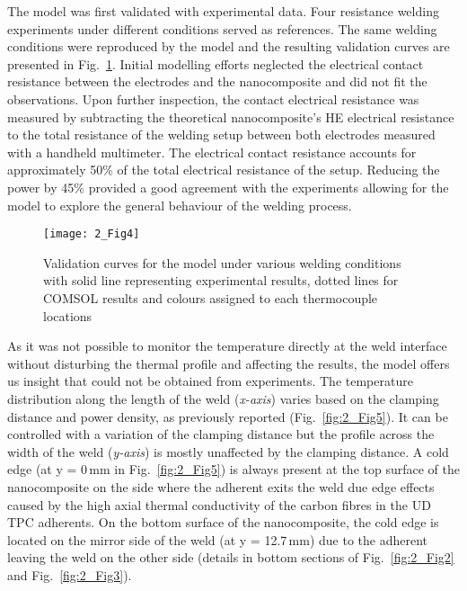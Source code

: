 The model was first validated with experimental data. 
Four resistance welding experiments under different conditions served as references. 
The same welding conditions were reproduced by the model and the resulting validation curves are presented in \mbox{Fig. \ref{fig:2_Fig4}}. 
Initial modelling efforts neglected the electrical contact resistance between the electrodes and the nanocomposite and did not fit the observations. 
Upon further inspection, the contact electrical resistance was measured by subtracting the theoretical nanocomposite’s HE electrical resistance to the total resistance of the welding setup between both electrodes measured with a handheld multimeter. 
The electrical contact resistance accounts for approximately 50\% of the total electrical resistance of the setup. 
Reducing the power by 45\% provided a good agreement with the experiments allowing for the model to explore the general behaviour of the welding process. 

\begin{figure}[ht]
	\center
	\texttt{[image: 2\_Fig4]}
	\caption{Validation curves for the model under various welding conditions with solid line representing experimental results, dotted lines for COMSOL results and colours assigned to each thermocouple locations \cite{Brassard2019b}}
	\label{fig:2_Fig4}
\end{figure} 

\FloatBarrier
As it was not possible to monitor the temperature directly at the weld interface without disturbing the thermal profile and affecting the results, the model offers us insight that could not be obtained from experiments. 
The temperature distribution along the length of the weld (\textit{x-axis}) varies based on the clamping distance and power density, as previously reported \cite{Talbot2013} (\mbox{Fig. \ref{fig:2_Fig5}}). 
It can be controlled with a variation of the clamping distance but the profile across the width of the weld (\textit{y-axis}) is mostly unaffected by the clamping distance. 
A cold edge (at y = \mbox{0\,mm} in \mbox{Fig. \ref{fig:2_Fig5}}) is always present at the top surface of the nanocomposite on the side where the adherent exits the weld due edge effects caused by the high axial thermal conductivity of the carbon fibres in the UD TPC adherents. 
On the bottom surface of the nanocomposite, the cold edge is located on the mirror side of the weld (at y = \mbox{12.7\,mm}) due to the adherent leaving the weld on the other side (details in bottom sections of \mbox{Fig. \ref{fig:2_Fig2}} and \mbox{Fig. \ref{fig:2_Fig3}}). 

